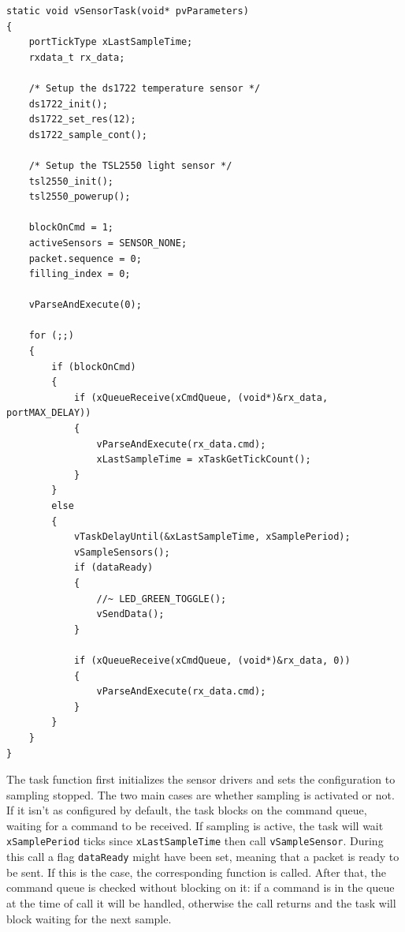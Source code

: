 \documentclass[11pt]{report}
\begin{document}
\begin{verbatim}
static void vSensorTask(void* pvParameters)
{
    portTickType xLastSampleTime;
    rxdata_t rx_data;
    
    /* Setup the ds1722 temperature sensor */
    ds1722_init();
    ds1722_set_res(12);
    ds1722_sample_cont();

    /* Setup the TSL2550 light sensor */
    tsl2550_init();
    tsl2550_powerup();
    
    blockOnCmd = 1;
    activeSensors = SENSOR_NONE;
    packet.sequence = 0;
    filling_index = 0;
    
    vParseAndExecute(0);
    
    for (;;)
    {
        if (blockOnCmd)
        {
            if (xQueueReceive(xCmdQueue, (void*)&rx_data, portMAX_DELAY))
            {
                vParseAndExecute(rx_data.cmd);
                xLastSampleTime = xTaskGetTickCount();
            }
        }
        else
        {
            vTaskDelayUntil(&xLastSampleTime, xSamplePeriod);
            vSampleSensors();
            if (dataReady)
            {
                //~ LED_GREEN_TOGGLE();
                vSendData();
            }
            
            if (xQueueReceive(xCmdQueue, (void*)&rx_data, 0))
            {
                vParseAndExecute(rx_data.cmd);
            }
        }
    }
}
\end{verbatim}

The task function first initializes the sensor drivers and sets the configuration to sampling stopped. The two main cases are whether sampling is activated or not. If it isn't as configured by default, the task blocks on the command queue, waiting for a command to be received. If sampling is active, the task will wait \verb$xSamplePeriod$ ticks since \verb$xLastSampleTime$ then call \verb$vSampleSensor$. During this call a flag \verb$dataReady$ might have been set, meaning that a packet is ready to be sent. If this is the case, the corresponding function is called. After that, the command queue is checked without blocking on it: if a command is in the queue at the time of call it will be handled, otherwise the call returns and the task will block waiting for the next sample.
\end{document}
